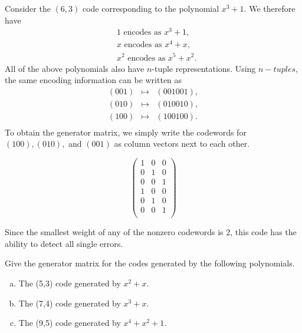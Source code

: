 \begin{example}{}
Consider the $(6,3)$ code corresponding to the polynomial $x^3+1$.  We therefore have
\begin{align*}
&1 \text{ encodes as }x^3+1,\\
&x \text{ encodes as }x^4+x,\\
&x^2 \text{ encodes as }x^5+x^2.
\end{align*}
All of the above polynomials also have $n$-tuple representations.  Using $n-tuples$, the same encoding information can be written as
\[
\begin{array}{rcl}
(001) & \mapsto & (001001),  \\
(010) & \mapsto & (010010) , \\
(100) & \mapsto & (100100). \\
\end{array}
\]
To obtain the generator matrix, we simply write the codewords for $(100), (010),$ and $(001)$ as column vectors next to each other.

\[\begin{pmatrix} 
1 & 0 & 0\\
0 & 1 & 0\\
0 & 0 & 1\\
1 & 0 & 0\\
0 & 1 & 0\\
0 & 0 & 1\\
\end{pmatrix}\]

Since the smallest weight of any of the nonzero codewords is 2, this code has the ability to detect all single errors.  

\end {example}

\begin{exercise}{}
Give the generator matrix for the codes generated by the following polynomials.
\begin{enumerate}[(a)]
\item The (5,3) code generated by $x^2 + x$.
\item The (7,4) code generated by $x^3 + x $.
\item The (9,5) code generated by $x^4 + x^2 + 1$.
\end {enumerate}
\end {exercise}

